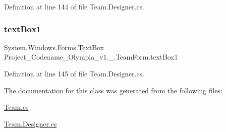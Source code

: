 Definition at line 144 of file Team.\+Designer.\+cs.

\mbox{\label{classProject__Codename__Olympia__v1_1_1__0_1_1TeamForm_add4251fb22f1ffed01ba862f2280c2d1}} 
\subsubsection{\texorpdfstring{text\+Box1}{textBox1}}
{\footnotesize\ttfamily System.\+Windows.\+Forms.\+Text\+Box Project\+\_\+\+Codename\+\_\+\+Olympia\+\_\+v1.\+\_.\+Team\+Form.\+text\+Box1\hspace{0.3cm}{\ttfamily [private]}}



Definition at line 145 of file Team.\+Designer.\+cs.



The documentation for this class was generated from the following files\+:\begin{DoxyCompactItemize}
\item 
\hyperlink{Team_8cs}{Team.\+cs}\item 
\hyperlink{Team_8Designer_8cs}{Team.\+Designer.\+cs}\end{DoxyCompactItemize}
